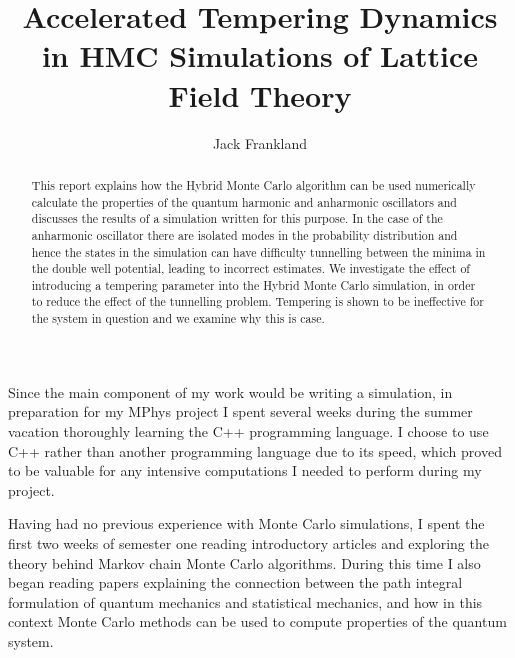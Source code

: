 \documentclass[12pt]{article}
\begin{document}
\title{Accelerated Tempering Dynamics in HMC Simulations of Lattice Field Theory} %
\author{Jack Frankland} %

\begin{abstract}
    This report explains how the Hybrid Monte Carlo algorithm can be used numerically calculate the properties of the quantum harmonic and anharmonic oscillators and discusses the results of a simulation written for this purpose. In the case of the anharmonic oscillator there are isolated modes in the probability distribution and hence the states in the simulation can have difficulty tunnelling between the minima in the double well potential, leading to incorrect estimates. We investigate the effect of introducing a tempering parameter into the Hybrid Monte Carlo simulation, in order to reduce the effect of the tunnelling problem. Tempering is shown to be ineffective for the system in question and we examine why this is case.
    
\end{abstract}

\maketitle

\personalstatement
    Since the main component of my work would be writing a simulation, in preparation for my MPhys project I spent several weeks during the summer vacation thoroughly learning the C++ programming language. I choose to use C++ rather than another programming language due to its speed, which proved to be valuable for any intensive computations I needed to perform during my project.

    Having had no previous experience with Monte Carlo simulations, I spent the first two weeks of semester one reading introductory articles and exploring the theory behind Markov chain Monte Carlo algorithms. During this time I also began reading papers explaining the connection between the path integral formulation of quantum mechanics and statistical mechanics, and how in this context Monte Carlo methods can be used to compute properties of the quantum system.
\end{document}
